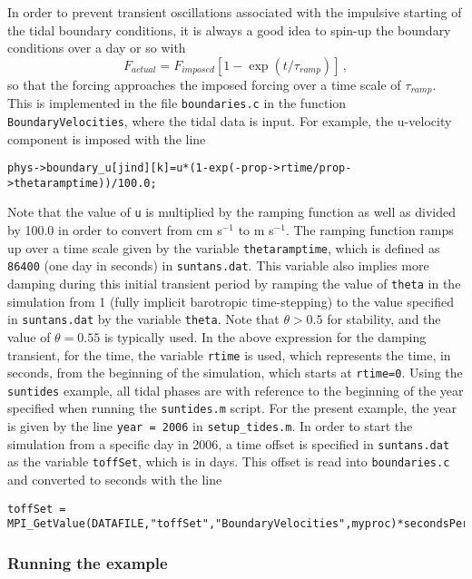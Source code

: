 In order to prevent transient oscillations associated with the impulsive starting of the tidal
boundary conditions, it is always a good idea to spin-up the boundary conditions over a day or so
with 
\[
F_{actual} = F_{imposed}\left[1-\exp(t/\tau_{ramp})\right]\,,
\]
so that the forcing approaches the imposed forcing over a time scale of $\tau_{ramp}$.  This is
implemented in the file \verb+boundaries.c+ in the function \verb+BoundaryVelocities+,
where the tidal data is input.  For example, the u-velocity component is imposed with the line
\begin{verbatim}
phys->boundary_u[jind][k]=u*(1-exp(-prop->rtime/prop->thetaramptime))/100.0;
\end{verbatim}
Note that the value of \verb+u+ is multiplied by the ramping function as well as divided by
100.0 in order to convert from cm s$^{-1}$ to m s$^{-1}$.  The ramping function ramps up over
a time scale given by the variable \verb+thetaramptime+, which is defined as \verb+86400+ (one day in seconds)
in \verb+suntans.dat+.  This variable also implies more damping during this initial transient period by
ramping the value of \verb+theta+ in the simulation from 1 (fully implicit barotropic time-stepping) to
the value specified in \verb+suntans.dat+ by the variable \verb+theta+.  Note that $\theta>0.5$ for stability,
and the value of $\theta=0.55$ is typically used.  In the above expression for the damping transient,
for the time, the variable \verb+rtime+ is used, which represents the time, in seconds, from the beginning
of the simulation, which starts at \verb+rtime=0+.  Using the \verb+suntides+ example, all tidal phases are with
reference to the beginning of the year specified when running the \verb+suntides.m+ script.  For the
present example, the year is given by the line \verb+year = 2006+ in \verb+setup_tides.m+.
In order to start the simulation from a specific day in 2006, a time offset is specified in \verb+suntans.dat+
as the variable \verb+toffSet+, which is in days.  This offset is read into \verb+boundaries.c+ and
converted to seconds with the line
{\footnotesize
\begin{verbatim}
toffSet = MPI_GetValue(DATAFILE,"toffSet","BoundaryVelocities",myproc)*secondsPerDay;
\end{verbatim}
}

\subsubsection{Running the example}

